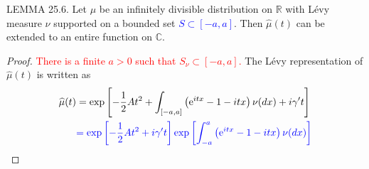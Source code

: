 \documentclass[a4paper,11pt]{article}
\begin{document}
LEMMA 25.6. Let $\mu$ be an infinitely divisible distribution on $\mathbb{R} $ with Lévy measure $\nu$
supported on a bounded set \textcolor{blue}{$S\subset[-a, a]$}. Then $\widehat{\mu}(t)$ can be extended to an entire function on $\mathbb{C}$.

\begin{proof}
    \textcolor{red}{There is a finite $a>0$ such that $S_{\nu} \subset[-a, a]$.} The Lévy representation of $\widehat{\mu}(t)$ is written as
    \begin{align*}
        \widehat{\mu}(t) & =\exp \left[-\frac{1}{2}At^{2} +\int_{[-a, a]}\left(\mathrm{e}^{i tx}-1-itx\right) \nu(dx)+i \gamma't \right]                                      \\
                         & \textcolor{blue}{ =\exp \left[-\frac{1}{2}At^{2}+i \gamma't \right] \exp \left[\int_{-a}^{a}\left(\mathrm{e}^{i tx}-1-itx\right) \nu(dx) \right] }
    \end{align*}


\end{proof}
\end{document}
